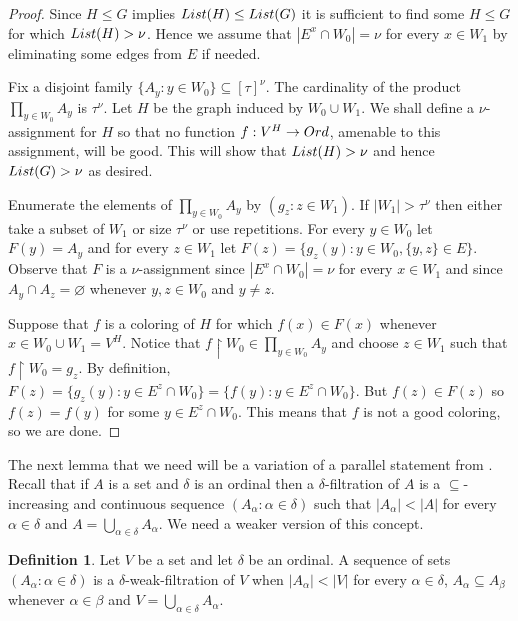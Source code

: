 \documentclass[11pt]{amsart}
\theoremstyle{definition}
\newtheorem{definition}[theorem]{Definition}
\theoremstyle{remark}
\begin{document}
\begin{proof}
Since $H\leq G$ implies ${\rm List}(H)\leq{\rm List}(G)$ it is sufficient to find some $H\leq G$ for which ${\rm List}(H)>\nu$.
Hence we assume that $|E^x\cap W_0|=\nu$ for every $x\in W_1$ by eliminating some edges from $E$ if needed.

Fix a disjoint family $\{A_y:y\in W_0\}\subseteq[\tau]^\nu$.
The cardinality of the product $\prod_{y\in W_0}A_y$ is $\tau^\nu$.
Let $H$ be the graph induced by $W_0\cup W_1$.
We shall define a $\nu$-assignment for $H$ so that no function $f:V^H\rightarrow{\rm Ord}$, amenable to this assignment, will be good.
This will show that ${\rm List}(H)>\nu$ and hence ${\rm List}(G)>\nu$ as desired.

Enumerate the elements of $\prod_{y\in W_0}A_y$ by $(g_z:z\in W_1)$.
If $|W_1|>\tau^\nu$ then either take a subset of $W_1$ or size $\tau^\nu$ or use repetitions.
For every $y\in W_0$ let $F(y)=A_y$ and for every $z\in W_1$ let $F(z)=\{g_z(y):y\in W_0,\{y,z\}\in E\}$.
Observe that $F$ is a $\nu$-assignment since $|E^x\cap W_0|=\nu$ for every $x\in W_1$ and since $A_y\cap A_z=\varnothing$ whenever $y,z\in W_0$ and $y\neq z$.

Suppose that $f$ is a coloring of $H$ for which $f(x)\in F(x)$ whenever $x\in W_0\cup W_1=V^H$.
Notice that $f\upharpoonright W_0\in\prod_{y\in W_0}A_y$ and choose $z\in W_1$ such that $f\upharpoonright W_0=g_z$.
By definition, $F(z)=\{g_z(y):y\in E^z\cap W_0\}=\{f(y):y\in E^z\cap W_0\}$.
But $f(z)\in F(z)$ so $f(z)=f(y)$ for some $y\in E^z\cap W_0$.
This means that $f$ is not a good coloring, so we are done.
\end{proof}

The next lemma that we need will be a variation of a parallel statement from \cite{MR4732367}.
Recall that if $A$ is a set and $\delta$ is an ordinal then a $\delta$-filtration of $A$ is a $\subseteq$-increasing and continuous sequence $(A_\alpha:\alpha\in\delta)$ such that $|A_\alpha|<|A|$ for every $\alpha\in\delta$ and $A=\bigcup_{\alpha\in\delta}A_\alpha$.
We need a weaker version of this concept.

\begin{definition}
  \label{defweakfiltration} Let $V$ be a set and let $\delta$ be an ordinal.
  A sequence of sets $(A_\alpha:\alpha\in\delta)$ is a $\delta$-weak-filtration of $V$ when $|A_\alpha|<|V|$ for every $\alpha\in\delta$, $A_\alpha\subseteq{A_\beta}$ whenever $\alpha\in\beta$ and $V=\bigcup_{\alpha\in\delta}A_\alpha$.
\end{definition}
\end{document}
